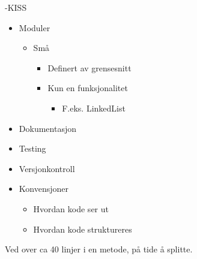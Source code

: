\documentclass[a4paper,norsk,10pt]{article}
\begin{document}
-KISS
\begin{itemize}
\item Moduler

\begin{itemize}
\item Små

\begin{itemize}
\item Definert av grensesnitt
\item Kun en funksjonalitet

\begin{itemize}
\item F.eks. LinkedList
\end{itemize}

\end{itemize}

\end{itemize}

\item Dokumentasjon
\item Testing
\item Versjonkontroll
\item Konvensjoner

\begin{itemize}
\item Hvordan kode ser ut
\item Hvordan kode struktureres
\end{itemize}

\end{itemize}

Ved over ca 40 linjer i en metode, på tide å splitte.
\end{document}
